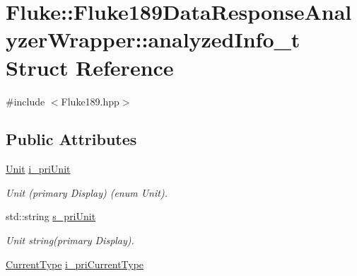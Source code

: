 \hypertarget{structFluke_1_1Fluke189DataResponseAnalyzerWrapper_1_1analyzedInfo__t}{
\section{Fluke::Fluke189DataResponseAnalyzerWrapper::analyzedInfo\_\-t Struct Reference}
\label{structFluke_1_1Fluke189DataResponseAnalyzerWrapper_1_1analyzedInfo__t}
}


{\ttfamily \#include $<$Fluke189.hpp$>$}\subsection*{Public Attributes}
\begin{DoxyCompactItemize}
\item 
\hypertarget{structFluke_1_1Fluke189DataResponseAnalyzerWrapper_1_1analyzedInfo__t_aba8eba7b53ed6345bdcbfb9bebfe4e61}{
\hyperlink{classFluke_1_1Fluke189DataResponseAnalyzerWrapper_ab8e5f2306e4d2ad3d741d273793aaed1}{Unit} \hyperlink{structFluke_1_1Fluke189DataResponseAnalyzerWrapper_1_1analyzedInfo__t_aba8eba7b53ed6345bdcbfb9bebfe4e61}{i\_\-priUnit}}
\label{structFluke_1_1Fluke189DataResponseAnalyzerWrapper_1_1analyzedInfo__t_aba8eba7b53ed6345bdcbfb9bebfe4e61}

\begin{DoxyCompactList}\small\item\em Unit (primary Display) (enum Unit). \item\end{DoxyCompactList}\item 
\hypertarget{structFluke_1_1Fluke189DataResponseAnalyzerWrapper_1_1analyzedInfo__t_add1e25b6f2d4709cdf6dac679bf9759d}{
std::string \hyperlink{structFluke_1_1Fluke189DataResponseAnalyzerWrapper_1_1analyzedInfo__t_add1e25b6f2d4709cdf6dac679bf9759d}{s\_\-priUnit}}
\label{structFluke_1_1Fluke189DataResponseAnalyzerWrapper_1_1analyzedInfo__t_add1e25b6f2d4709cdf6dac679bf9759d}

\begin{DoxyCompactList}\small\item\em Unit string(primary Display). \item\end{DoxyCompactList}\item 
\hypertarget{structFluke_1_1Fluke189DataResponseAnalyzerWrapper_1_1analyzedInfo__t_aac9913e9a3b6cca77d9b339f5090493c}{
\hyperlink{classFluke_1_1Fluke189DataResponseAnalyzerWrapper_afef24496da239e3613c40ad3582d7adc}{CurrentType} \hyperlink{structFluke_1_1Fluke189DataResponseAnalyzerWrapper_1_1analyzedInfo__t_aac9913e9a3b6cca77d9b339f5090493c}{i\_\-priCurrentType}}
\label{structFluke_1_1Fluke189DataResponseAnalyzerWrapper_1_1analyzedInfo__t_aac9913e9a3b6cca77d9b339f5090493c}


\end{DoxyCompactItemize}

